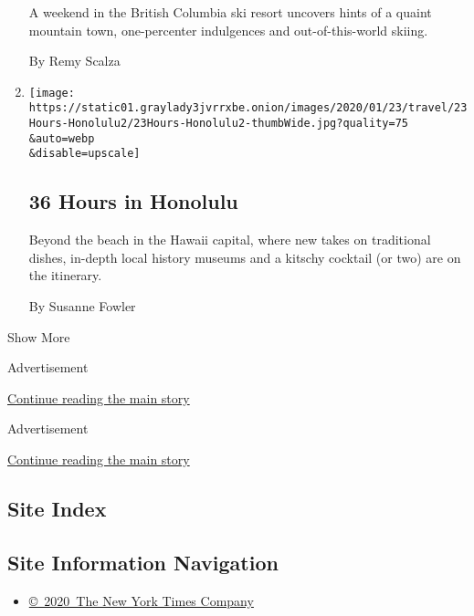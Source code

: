 \begin{enumerate}
  A weekend in the British Columbia ski resort uncovers hints of a
  quaint mountain town, one-percenter indulgences and out-of-this-world
  skiing.

  By Remy Scalza
\item
  \href{/2020/01/23/travel/36-hours-what-to-do-in-honolulu.html}{}

  \texttt{[image: https://static01.graylady3jvrrxbe.onion/images/2020/01/23/travel/23Hours-Honolulu2/23Hours-Honolulu2-thumbWide.jpg?quality=75\\\&auto=webp\\\&disable=upscale]}

  \hypertarget{36-hours-in-honolulu}{%
  \subsection{36 Hours in Honolulu}\label{36-hours-in-honolulu}}

  Beyond the beach in the Hawaii capital, where new takes on traditional
  dishes, in-depth local history museums and a kitschy cocktail (or two)
  are on the itinerary.

  By Susanne Fowler
\end{enumerate}

Show More

Advertisement

\protect\hyperlink{after-mid1}{Continue reading the main story}

Advertisement

\protect\hyperlink{after-mktg}{Continue reading the main story}

\hypertarget{site-index}{%
\subsection{Site Index}\label{site-index}}

\hypertarget{site-information-navigation}{%
\subsection{Site Information
Navigation}\label{site-information-navigation}}

\begin{itemize}
\tightlist
\item
  \href{https://help.nytimes3xbfgragh.onion/hc/en-us/articles/115014792127-Copyright-notice}{©~2020~The
  New York Times Company}
\end{itemize}

